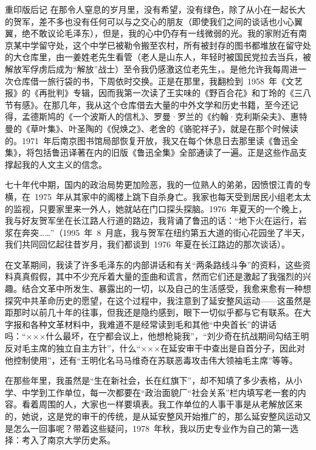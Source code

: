 \begin{pre-post-text}{重印版后记}
在那令人窒息的岁月里，没有希望，没有绿色，除了从小在一起长大的贺军，差不多也没有任何可以与之交心的朋友（即使我们之间的谈话也小心翼翼，绝不敢议论毛泽东），但是，我的心中仍存有一线微弱的光。我的家附近有南京某中学留守处，这个中学已被勒令搬至农村，所有被封存的图书都堆放在留守处的大仓库里，由一姜姓老先生看管（老人是山东人，年轻时被国民党拉去当兵，被解放军俘虏后成为“解放”战士）至令我仍感激这位老先生，。是他允许我每周进一次仓库借一旅行袋的书，下周依时交换。正是在那里，我翻检到~1958~年《文艺报》的《再批判》专辑，因而我第一次读了王实味的《野百合花》和丁玲的《三八节有感》。在那几年，我从这个仓库借去大量的中外文学和历史书籍，至今还记得，孟德斯鸠的《一个波斯人的信札》、罗曼·罗兰的《约翰·克利斯朵夫》、惠特曼的《草叶集》、叶圣陶的《倪焕之》、老舍的《骆驼祥子》，就是在那个时候读的。1971~年后南京图书馆局部恢复开放，我又在每个休息日去那里读《鲁迅全集》，将包括鲁迅译著在内的旧版《鲁迅全集》全部通读了一遍。正是这些作品支撑起我的人文主义的信念。

七十年代中期，国内的政治局势更加险恶，我的一位熟人的弟弟，因愤恨江青的专横，在~1975~年从其家中的阁楼上跳下自杀身亡。我家也每天受到居民小组老太太的监视，只要家里来一外人，她就站在门口探头探脑。1976~年夏天的一个晚上，我与好友贺军坐在长江路人行道的路边，我背诵了鲁迅的话：“地下火在运行，岩浆在奔突……”（1995~年~8~月底，我与贺军在纽约第五大道的街心花园坐了半天，我们共同回忆起往昔岁月，我们都谈到~1976~年夏在长江路边的那次谈话）。

在文革期间，我读了许多毛泽东的内部讲话和有关“两条路线斗争”的资料，这些资料真真假假，其中不少充斥着大量的歪曲和谎言，然而它们还是激起了我强烈的兴趣。结合文革中所发生、暴露出的一切，以及自己的生活感受，我愈来愈有一种想探究中共革命历史的愿望，在这个过程中，我注意到了延安整风运动——这虽然是距那时以前几十年的往事，但我还是隐约感到，眼下一切似乎都与它有联系。在大字报和各种文革材料中，我难道不是经常读到毛和其他“中央首长”的讲话吗：“×××什么最坏，在宁都会议上，他想枪毙我”，“刘少奇在抗战期间勾结王明反对毛主席的独立自主方针”，什么“×××在延安审干中查出是自首分子，因此对他控制使用”，还有“王明化名马马维奇在苏联恶毒攻击伟大领袖毛主席”等等。

在那些年里，我虽然是“生在新社会，长在红旗下”，却不知填了多少表格，从小学、中学到工作单位，每一次都要在“政治面貌厂“社会关系”栏内填写老一套的内容。看着周围的人，大家也一样要填表。我工作单位的人事干事是从老解放区来的，她说，这是党的审干的传统，是从延安整风开始推广的，那么延安整风运动又是怎么一回事呢？带着这些疑问，1978~年秋，我以历史专业作为自己的第一选择：考入了南京大学历史系。


\end{pre-post-text}
